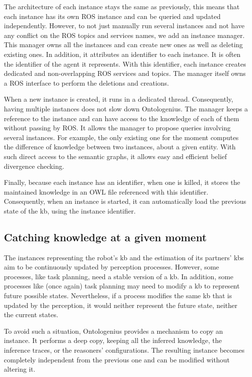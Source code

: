 The architecture of each instance stays the same as previously, this means that each instance has its own ROS instance and can be queried and updated independently. However, to not just manually run several instances and not have any conflict on the ROS topics and services names, we add an instance manager. This manager owns all the instances and can create new ones as well as deleting existing ones. In addition, it attributes an identifier to each instance. It is often the identifier of the agent it represents. With this identifier, each instance creates dedicated and non-overlapping ROS services and topics. The manager itself owns a ROS interface to perform the deletions and creations.

When a new instance is created, it runs in a dedicated thread. Consequently, having multiple instances does not slow down Ontologenius. The manager keeps a reference to the instance and can have access to the knowledge of each of them without passing by ROS. It allows the manager to propose queries involving several instances. For example, the only existing one for the moment computes the difference of knowledge between two instances, about a given entity. With such direct access to the semantic graphs, it allows easy and efficient belief divergence checking.

Finally, because each instance has an identifier, when one is killed, it stores the maintained knowledge in an OWL file referenced with this identifier. Consequently, when an instance is started, it can automatically load the previous state of the \acrshort{kb}, using the instance identifier.

\subsection{Catching knowledge at a given moment}

The instances representing the robot's \acrshort{kb} and the estimation of its partners' \acrshort{kb}s aim to be continuously updated by perception processes. However, some processes, like task planning, need a stable version of a \acrshort{kb}. In addition, some processes like (once again) task planning may need to modify a \acrshort{kb} to represent future possible states. Nevertheless, if a process modifies the same \acrshort{kb} that is updated by the perception, it would neither represent the future state, neither the current states.

To avoid such a situation, Ontologenius provides a mechanism to copy an instance. It performs a deep copy, keeping all the inferred knowledge, the inference traces, or the reasoners' configurations. The resulting instance becomes completely independent from the previous one and can be modified without altering it.


